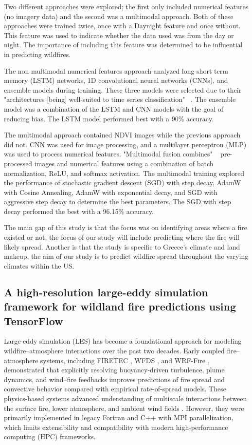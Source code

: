 \documentclass[conference]{IEEEtran}
\begin{document}
Two different approaches were explored; the first only included numerical features (no imagery data) and the second was a multimodal approach. Both of these approaches were trained twice, once with a Daynight feature and once without. This feature was used to indicate whether the data used was from the day or night. The importance of including this feature was determined to be influential in predicting wildfires. 

The non multimodal numerical features approach analyzed long short term memory (LSTM) networks, 1D convolutional neural networks (CNNs), and ensemble models during training. These three models were selected due to their "architectures [being] well-suited to time series classification" \ \cite{papakis2025AMultimodalEnsembleDeepLearning}. The ensemble model was a combination of the LSTM and CNN models with the goal of reducing bias. The LSTM model performed best with a 90\% accuracy. 

The multimodal approach contained NDVI images while the previous approach did not. CNN was used for image processing, and a multilayer perceptron (MLP) was used to process numerical features. "Multimodal fusion combines" \ \cite{papakis2025AMultimodalEnsembleDeepLearning} pre-processed images and numerical features using a combination of batch normalization, ReLU, and softmax activation. The multimodal training explored the performance of stochastic gradient descent (SGD) with step decay, AdamW with Cosine Annealing, AdamW with exponential decay, and SGD with aggressive step decay to determine the best parameters. The SGD with step decay performed the best with a 96.15\% accuracy. 

The main gap of this study is that the focus was on identifying areas where a fire existed or not, the focus of our study will include predicting where the fire will likely spread. Another is that the study is specific to Greece's climate and land makeup, the aim of our study is to predict wildfire spread throughout the varying climates within the US. 

\subsection{A high-resolution large-eddy simulation framework for wildland fire predictions using TensorFlow}
Large-eddy simulation (LES) has become a foundational approach for modeling wildfire--atmosphere interactions over the past two decades. Early coupled fire--atmosphere systems, including FIRETEC \citep{linn2002firetec}, WFDS \citep{mell2009wildland}, and WRF-Fire \citep{coen2013wrf}, demonstrated that explicitly resolving buoyancy-driven turbulence, plume dynamics, and wind--fire feedbacks improves predictions of fire spread and convective behavior compared with empirical rate-of-spread models. These physics-based systems advanced understanding of multiscale interactions between the surface fire, lower atmosphere, and ambient wind fields \citep{sullivan2009wildland,bakhshaii2019review}. However, they were primarily implemented in legacy Fortran and C++ with MPI parallelization, which limits extensibility and compatibility with modern high-performance computing (HPC) frameworks.
\end{document}
